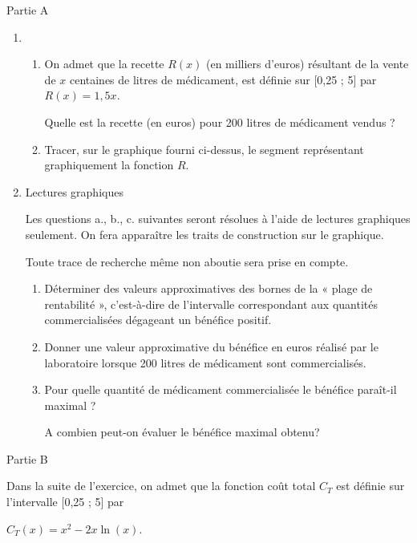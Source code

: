 \begin{h3}Partie A\end{h3}
\begin{enumerate}
     \item
     \begin{enumerate}[label=\alph*.] 
          \item
          On admet que la recette $R\left(x\right)$ (en milliers d'euros) résultant de la vente de $x$ centaines de litres de médicament, est définie sur [0,25 ; 5] par $R\left(x\right)=1,5 x$.
          \par
          Quelle est la recette (en euros) pour 200 litres de médicament vendus ?
          \item
          Tracer, sur le graphique fourni ci-dessus, le segment représentant graphiquement la fonction $R$.
     \end{enumerate}
     \item
     Lectures graphiques
     \par
     Les questions a., b., c. suivantes seront résolues à l'aide de lectures graphiques seulement. On fera apparaître les traits de construction sur le graphique.
     \par
     Toute trace de recherche même non aboutie sera prise en compte.
     \begin{enumerate}[label=\alph*.] 
          \item
          Déterminer des valeurs approximatives des bornes de la « plage de rentabilité », c'est-à-dire de l'intervalle correspondant aux quantités commercialisées dégageant un bénéfice positif.
          \item
          Donner une valeur approximative du bénéfice en euros réalisé par le laboratoire lorsque 200 litres de médicament sont commercialisés.
          \item
          Pour quelle quantité de médicament commercialisée le bénéfice paraît-il maximal ?
          \par
          A combien peut-on évaluer le bénéfice maximal obtenu?
     \end{enumerate}
\end{enumerate}
\begin{h3}Partie B\end{h3}
Dans la suite de l'exercice, on admet que la fonction coût total $C_{T}$ est définie sur l'intervalle [0,25 ; 5] par
\par
$C_{T}\left(x\right)=x^{2}-2x \ln \left(x\right)$.

